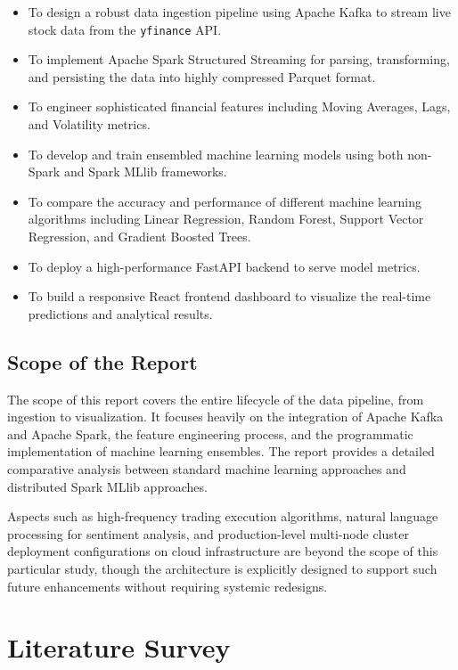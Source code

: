 \documentclass[12pt,a4paper]{report}
\begin{document}
\begin{itemize}
    \item To design a robust data ingestion pipeline using Apache Kafka to stream live stock data from the \texttt{yfinance} API.
    \item To implement Apache Spark Structured Streaming for parsing, transforming, and persisting the data into highly compressed Parquet format.
    \item To engineer sophisticated financial features including Moving Averages, Lags, and Volatility metrics.
    \item To develop and train ensembled machine learning models using both non-Spark and Spark MLlib frameworks.
    \item To compare the accuracy and performance of different machine learning algorithms including Linear Regression, Random Forest, Support Vector Regression, and Gradient Boosted Trees.
    \item To deploy a high-performance FastAPI backend to serve model metrics.
    \item To build a responsive React frontend dashboard to visualize the real-time predictions and analytical results.
\end{itemize}

\subsection{Scope of the Report}

The scope of this report covers the entire lifecycle of the data pipeline, from ingestion to visualization. It focuses heavily on the integration of Apache Kafka and Apache Spark, the feature engineering process, and the programmatic implementation of machine learning ensembles. The report provides a detailed comparative analysis between standard machine learning approaches and distributed Spark MLlib approaches. 

Aspects such as high-frequency trading execution algorithms, natural language processing for sentiment analysis, and production-level multi-node cluster deployment configurations on cloud infrastructure are beyond the scope of this particular study, though the architecture is explicitly designed to support such future enhancements without requiring systemic redesigns.

\clearpage

\section{Literature Survey}
\end{document}
